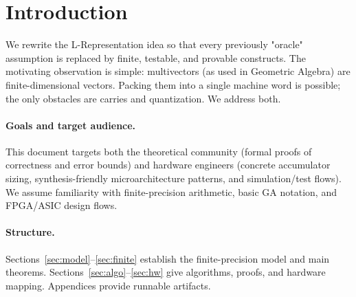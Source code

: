 \documentclass[11pt]{article}
\theoremstyle{definition}
\theoremstyle{plain}
\begin{document}
\begin{abstract}
\begin{enumerate}
  \item A reproducible FPGA/ASIC simulation and validation plan: Verilog reference microarchitecture, Verilator-based functional simulation, high-level fixed-point Python reference model, and HLS/Vivado/Quartus synthesis notes. We provide a self-contained RTL testbench design pattern and an algorithmic mapping from per-field parameters to estimated DSP/LUT usage and timing budgets (sample mapping and script in Appendix~\ref{app:sim}).
  \item A complete LaTeX-ready appendix with proofs (mechanized-translation friendly), runnable Python prototypes for bound computation, and recommended test vectors for exhaustive corner-case verification.
\end{enumerate}
The result is a practical blueprint: no oracle/"unbounded accumulator" assumptions remain. The paper includes proofs, proof sketches where the combinatorial detail is lengthy, and a pragmatic engineering plan so the community can reproduce, verify, and extend the design.
\end{abstract}

\section{Introduction}
We rewrite the L-Representation idea so that every previously "oracle" assumption is replaced by finite, testable, and provable constructs.  The motivating observation is simple: multivectors (as used in Geometric Algebra) are finite-dimensional vectors.  Packing them into a single machine word is possible; the only obstacles are carries and quantization.  We address both.

\paragraph{Goals and target audience.}  This document targets both the theoretical community (formal proofs of correctness and error bounds) and hardware engineers (concrete accumulator sizing, synthesis-friendly microarchitecture patterns, and simulation/test flows).  We assume familiarity with finite-precision arithmetic, basic GA notation, and FPGA/ASIC design flows.

\paragraph{Structure.} Sections~\ref{sec:model}--\ref{sec:finite} establish the finite-precision model and main theorems.  Sections~\ref{sec:algo}--\ref{sec:hw} give algorithms, proofs, and hardware mapping.  Appendices provide runnable artifacts.
\end{document}
